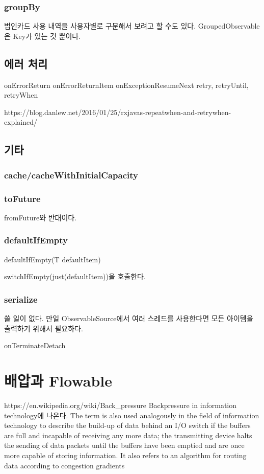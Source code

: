 \documentclass{book}
\begin{document}
{\subsection{groupBy}
법인카드 사용 내역을 사용자별로 구분해서 보려고 할 수도 있다.
GroupedObservable은 Key가 있는 것 뿐이다.

\section{에러 처리}
onErrorReturn
onErrorReturnItem
onExceptionResumeNext
retry, retryUntil, retryWhen

https://blog.danlew.net/2016/01/25/rxjavas-repeatwhen-and-retrywhen-explained/

\section{기타}
\subsection{cache/cacheWithInitialCapacity}
\subsection{toFuture}
fromFuture와 반대이다.

\subsection{defaultIfEmpty}
defaultIfEmpty(T defaultItem)

switchIfEmpty(just(defaultItem))을 호출한다.

\subsection{serialize}
쓸 일이 없다. 만일 ObservableSource에서 여러 스레드를 사용한다면 모든 아이템을 출력하기 위해서 필요하다.

onTerminateDetach


\chapter{배압과 Flowable}
https://en.wikipedia.org/wiki/Back_pressure
Backpressure in information technology에 나온다.
The term is also used analogously in the field of information technology to describe the build-up of data behind an I/O switch if the buffers are full and incapable of receiving any more data; the transmitting device halts the sending of data packets until the buffers have been emptied and are once more capable of storing information. It also refers to an algorithm for routing data according to congestion gradients

}
\end{document}
